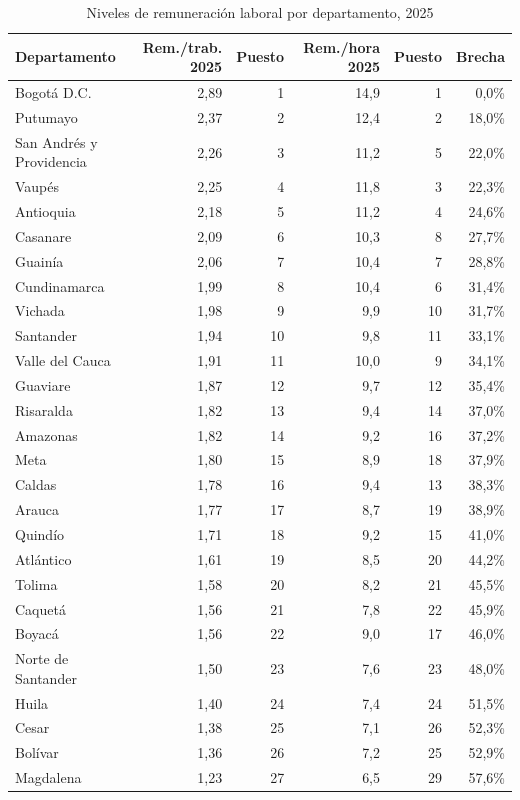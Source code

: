 \begin{table}[H]
\centering
\caption{Niveles de remuneración laboral por departamento, 2025}
\label{tab:dept_remuneracion_niveles_33}
\scriptsize
\begin{tabular}{lrrrrr}
\toprule
Departamento & Rem./trab. 2025 & Puesto & Rem./hora 2025 & Puesto & Brecha \\
\midrule
Bogotá D.C. & 2,89 & 1 & 14,9 & 1 & 0,0\% \\
Putumayo & 2,37 & 2 & 12,4 & 2 & 18,0\% \\
San Andrés y Providencia & 2,26 & 3 & 11,2 & 5 & 22,0\% \\
Vaupés & 2,25 & 4 & 11,8 & 3 & 22,3\% \\
Antioquia & 2,18 & 5 & 11,2 & 4 & 24,6\% \\
Casanare & 2,09 & 6 & 10,3 & 8 & 27,7\% \\
Guainía & 2,06 & 7 & 10,4 & 7 & 28,8\% \\
Cundinamarca & 1,99 & 8 & 10,4 & 6 & 31,4\% \\
Vichada & 1,98 & 9 & 9,9 & 10 & 31,7\% \\
Santander & 1,94 & 10 & 9,8 & 11 & 33,1\% \\
Valle del Cauca & 1,91 & 11 & 10,0 & 9 & 34,1\% \\
Guaviare & 1,87 & 12 & 9,7 & 12 & 35,4\% \\
Risaralda & 1,82 & 13 & 9,4 & 14 & 37,0\% \\
Amazonas & 1,82 & 14 & 9,2 & 16 & 37,2\% \\
Meta & 1,80 & 15 & 8,9 & 18 & 37,9\% \\
Caldas & 1,78 & 16 & 9,4 & 13 & 38,3\% \\
Arauca & 1,77 & 17 & 8,7 & 19 & 38,9\% \\
Quindío & 1,71 & 18 & 9,2 & 15 & 41,0\% \\
Atlántico & 1,61 & 19 & 8,5 & 20 & 44,2\% \\
Tolima & 1,58 & 20 & 8,2 & 21 & 45,5\% \\
Caquetá & 1,56 & 21 & 7,8 & 22 & 45,9\% \\
Boyacá & 1,56 & 22 & 9,0 & 17 & 46,0\% \\
Norte de Santander & 1,50 & 23 & 7,6 & 23 & 48,0\% \\
Huila & 1,40 & 24 & 7,4 & 24 & 51,5\% \\
Cesar & 1,38 & 25 & 7,1 & 26 & 52,3\% \\
Bolívar & 1,36 & 26 & 7,2 & 25 & 52,9\% \\
Magdalena & 1,23 & 27 & 6,5 & 29 & 57,6\% \\

\end{tabular}
\end{table}
